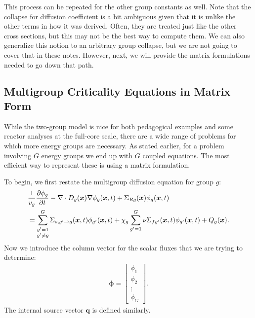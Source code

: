 This process can be repeated for the other group constants as well. Note that the collapse for diffusion coefficient is a bit ambiguous given that it is unlike the other terms in how it was derived. Often, they are treated just like the other cross sections, but this may not be the best way to compute them. We can also generalize this notion to an arbitrary group collapse, but we are not going to cover that in these notes. However, next, we will provide the matrix formulations needed to go down that path.

\subsection{Multigroup Criticality Equations in Matrix Form}

While the two-group model is nice for both pedagogical examples and some reactor analyses at the full-core scale, there are a wide range of problems for which more energy groups are necessary. As stated earlier, for a problem involving $G$ energy groups we end up with $G$ coupled equations. The most efficient way to represent these is using a matrix formulation.

To begin, we first restate the multigroup diffusion equation for group $g$:
\begin{align}
  &\frac{1}{v_g} \frac{ \partial {\phi_g} }{ \partial {t} } - \nabla \cdot D_g(\bm{x}) \nabla \phi_g(\bm{x},t) + \Sigma_{Rg}(\bm{x}) \phi_g(\bm{x},t) \nonumber \\*
  &= \sum_{\substack{g' =1 \\ g' \ne g}}^G  \Sigma_{s,g' \rightarrow g}(\bm{x},t) \phi_{g'}(\bm{x},t) + \chi_g \sum_{g'=1}^G   \nu\Sigma_{fg'}(\bm{x},t) \phi_{g'}(\bm{x},t) + Q_{g}(\bm{x}) . \nonumber
\end{align}
Now we introduce the column vector for the scalar fluxes that we are trying to determine:
\begin{align}
  \boldsymbol\phi = \left[ \begin{array}{c} \phi_1 \\ \phi_2 \\ \vdots \\ \phi_G \end{array} \right] .
\end{align}
The internal source vector $\mathbf{q}$ is defined similarly.

